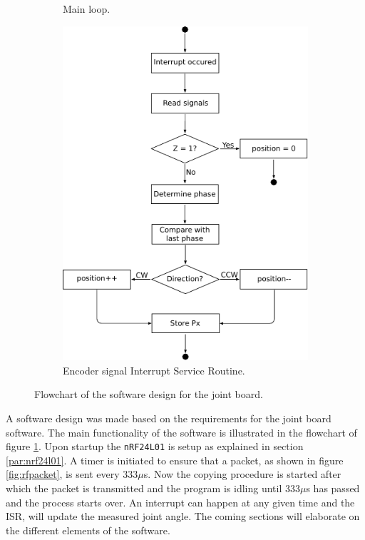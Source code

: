 \begin{figure}[h]
\begin{subfigure}[b]{0.30\textwidth}
		\caption{Main loop.}
		\label{sfig:joint_main_flowchart}
	\end{subfigure}
	\begin{subfigure}[b]{0.69\textwidth}
		\centering
		\includegraphics[width=.8\linewidth]{graphics/joint_interrupt}
		\caption{Encoder signal Interrupt Service Routine.}
		\label{sfig:joint_interrupt}
	\end{subfigure}
	\caption{Flowchart of the software design for the joint board.}
	\label{fig:joint_software}
\end{figure}
A software design was made based on the requirements for the joint board software.
The main functionality of the software is illustrated in the flowchart of figure \ref{sfig:joint_main_flowchart}.
Upon startup the \texttt{nRF24L01} is setup as explained in section \ref{par:nrf24l01}.
A timer is initiated to ensure that a packet, as shown in figure \ref{fig:rfpacket}, is sent every 333$\mu$s.
Now the copying procedure is started after which the packet is transmitted and the program is idling until 333$\mu$s has passed and the process starts over.
An interrupt can happen at any given time and the ISR, will update the measured joint angle. 
The coming sections will elaborate on the different elements of the software.

